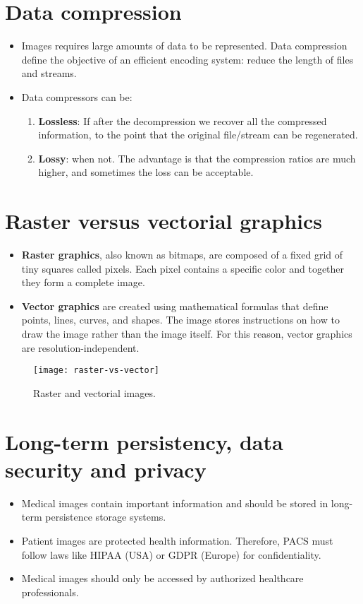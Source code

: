 \section{Data compression}
\begin{itemize}
\item Images requires large amounts of data to be represented. Data
compression define the objective of an efficient encoding system:
reduce the length of files and streams.
\item Data compressors can be:
\begin{enumerate}
\item \textbf{Lossless}: If after the decompression we recover all the
compressed information, to the point that the original file/stream can
be regenerated.
\item \textbf{Lossy}: when not. The advantage is that the compression
ratios are much higher, and sometimes the loss can be acceptable.
\end{enumerate}
\end{itemize}

\section{Raster versus vectorial graphics}
\begin{itemize}
\item \textbf{Raster graphics}, also known as bitmaps, are composed of
  a fixed grid of tiny squares called pixels. Each pixel contains a
  specific color and together they form a complete image.
\item \textbf{Vector graphics} are created using mathematical formulas
  that define points, lines, curves, and shapes. The image stores
  instructions on how to draw the image rather than the image itself.
  For this reason, vector graphics are resolution-independent.
\end{itemize}
\begin{figure}[H]
  \vspace{-2ex}
  \centering
  \texttt{[image: raster-vs-vector]}
  \caption{Raster and vectorial images.}
  \label{fig:raster_vs_vector}
\end{figure}

\section{Long-term persistency, data security and privacy}
\begin{itemize}
\item Medical images contain important information and should be
  stored in long-term persistence storage systems.
\item Patient images are protected health information. Therefore,
  \gls{PACS} must follow laws like HIPAA (USA) or GDPR (Europe) for
  confidentiality.
\item Medical images should only be accessed by authorized healthcare
  professionals.
\end{itemize}
